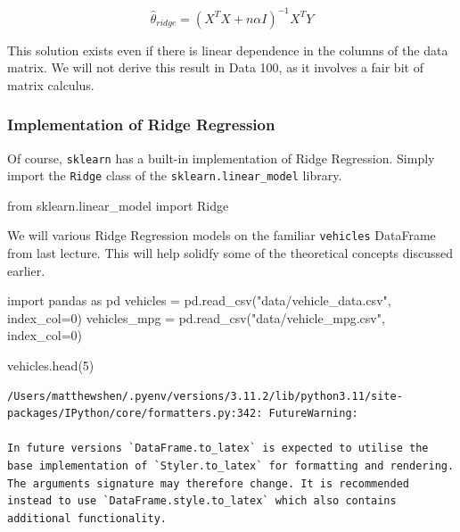 \documentclass[
  letterpaper,
  DIV=11,
  numbers=noendperiod]{scrreprt}
\newenvironment{Shaded}{\begin{snugshade}}{\end{snugshade}}
\newcommand{\DecValTok}[1]{\textcolor[rgb]{0.68,0.00,0.00}{#1}}
\newcommand{\ImportTok}[1]{\textcolor[rgb]{0.00,0.46,0.62}{#1}}
\newcommand{\NormalTok}[1]{\textcolor[rgb]{0.00,0.23,0.31}{#1}}
\newcommand{\OperatorTok}[1]{\textcolor[rgb]{0.37,0.37,0.37}{#1}}
\newcommand{\StringTok}[1]{\textcolor[rgb]{0.13,0.47,0.30}{#1}}
\begin{document}
\[\hat\theta_{ridge} = (X^TX + n\alpha I)^{-1}X^TY\]

This solution exists even if there is linear dependence in the columns
of the data matrix. We will not derive this result in Data 100, as it
involves a fair bit of matrix calculus.

\hypertarget{implementation-of-ridge-regression}{%
\subsubsection{Implementation of Ridge
Regression}\label{implementation-of-ridge-regression}}

Of course, \texttt{sklearn} has a built-in implementation of Ridge
Regression. Simply import the \texttt{Ridge} class of the
\texttt{sklearn.linear\_model} library.

\begin{Shaded}
\begin{Highlighting}[]
\ImportTok{from}\NormalTok{ sklearn.linear\_model }\ImportTok{import}\NormalTok{ Ridge}
\end{Highlighting}
\end{Shaded}

We will various Ridge Regression models on the familiar
\texttt{vehicles} DataFrame from last lecture. This will help solidfy
some of the theoretical concepts discussed earlier.

\begin{Shaded}
\begin{Highlighting}[]
\ImportTok{import}\NormalTok{ pandas }\ImportTok{as}\NormalTok{ pd}
\NormalTok{vehicles }\OperatorTok{=}\NormalTok{ pd.read\_csv(}\StringTok{"data/vehicle\_data.csv"}\NormalTok{, index\_col}\OperatorTok{=}\DecValTok{0}\NormalTok{)}
\NormalTok{vehicles\_mpg }\OperatorTok{=}\NormalTok{ pd.read\_csv(}\StringTok{"data/vehicle\_mpg.csv"}\NormalTok{, index\_col}\OperatorTok{=}\DecValTok{0}\NormalTok{)}
\end{Highlighting}
\end{Shaded}

\begin{Shaded}
\begin{Highlighting}[]
\NormalTok{vehicles.head(}\DecValTok{5}\NormalTok{)}
\end{Highlighting}
\end{Shaded}

\begin{verbatim}
/Users/matthewshen/.pyenv/versions/3.11.2/lib/python3.11/site-packages/IPython/core/formatters.py:342: FutureWarning:

In future versions `DataFrame.to_latex` is expected to utilise the base implementation of `Styler.to_latex` for formatting and rendering. The arguments signature may therefore change. It is recommended instead to use `DataFrame.style.to_latex` which also contains additional functionality.
\end{verbatim}
\end{document}
